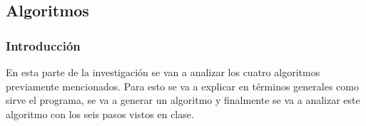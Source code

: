\documentclass[stu, 11pt, letterpaper, donotrepeattitle, floatsintext, natbib, helv]{apa7}
\begin{document}
\renewcommand{\listalgorithmname}{\largeÍndice de algoritmos}
\listofalgorithms
\newpage





\begin{singlespace}




\part*{Algoritmos}

\section*{Introducción}
\quad En esta parte de la investigación se van a analizar los cuatro algoritmos previamente mencionados. Para esto se va a explicar en términos generales como sirve el programa, se va a generar un algoritmo y finalmente se va a analizar este algoritmo con los seis pasos vistos en clase.













\appendix

\newpage
\renewcommand\refname{\large\textbf{Referencias}}

\end{singlespace}
\end{document}
